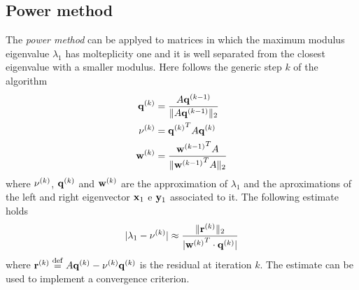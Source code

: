 \subsection*{Power method}

The \emph{power method} can be applyed to matrices in which the maximum modulus
eigenvalue $\lambda_1$ has molteplicity one and it is well separated from the
closest eigenvalue with a smaller modulus. Here follows the generic step $k$ of
the algorithm
\begin{align*}
    {\bf q}^{\left( k\right)} &= \frac{ A{\bf q}^{\left( k-1\right)} }{
        \|  A{\bf q}^{\left( k-1\right)}\|_2 } \\
    {\bf \nu}^{\left( k\right)} &= {{\bf q}^{\left( k\right)}}^T  A {\bf q}^{\left( k\right)} \\
    {\bf w}^{\left( k\right)} &= \frac{ {{\bf w}^{\left( k-1\right)}}^T A }{
        \|  {{\bf w}^{\left( k-1\right)}}^T A\|_2 }
\end{align*}
where $\nu^{\left( k\right)}$, ${\bf q}^{\left( k\right)}$ and ${\bf w}^{\left( k\right)}$ are the
approximation of $\lambda_1$ and the aproximations of the left and right
eigenvector ${\bf x}_1$ e ${\bf y}_1$ associated to it. The following estimate
holds
\begin{align*}
    \module{ \lambda_1 - \nu\iter{k} } \approx %
    \frac{ \norm{ {\bf r}\iter{k} }_2 }{
    \module{ {{\bf w}\iter{k}}^T \cdot{\bf q}\iter{k} } }
\end{align*}
where ${\bf r}^{\left( k\right)} \stackrel{\mathrm{def}}{=} A{\bf q}^{\left( k\right)} - \nu^{\left( k\right)}{\bf
q}^{\left( k\right)}$ is the residual at iteration $k$. The estimate can be used to
implement a convergence criterion.
